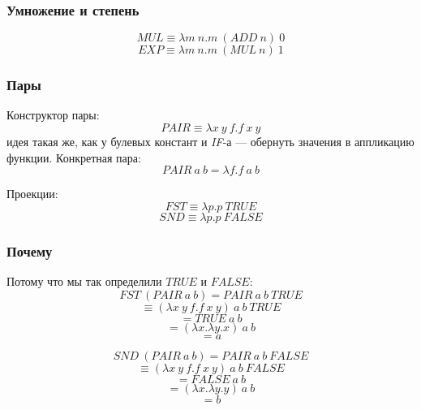 \documentclass[xetex,mathserif,serif]{beamer}
\begin{document}
	\begin{frame}
		\frametitle{Умножение и степень}
		$$MUL \equiv \lambda m\ n.m\ (ADD\ n)\ 0$$
		$$EXP \equiv \lambda m\ n.m\ (MUL\ n)\ 1$$
	\end{frame}

	\begin{frame}
		\frametitle{Пары}
		Конструктор пары:
		$$PAIR \equiv \lambda x\ y\ f.f\ x\ y$$
		идея такая же, как у булевых констант и \textit{IF}-а --- обернуть значения в аппликацию функции. Конкретная пара:
		$$PAIR\ a\ b = \lambda f.f\ a\ b$$
		
		Проекции:
		$$FST \equiv \lambda p.p\ TRUE$$
		$$SND \equiv \lambda p.p\ FALSE$$
	\end{frame}

	\begin{frame}
		\frametitle{Почему}
		Потому что мы так определили $TRUE$ и $FALSE$:
		$$FST\ (PAIR\ a\ b) = PAIR\ a\ b\ TRUE$$
		$$\equiv (\lambda x\ y\ f.f\ x\ y)\ a\ b\ TRUE$$
		$$= TRUE\ a\ b$$
		$$= (\lambda x.\lambda y.x)\ a\ b$$
		$$= a$$

		$$SND\ (PAIR\ a\ b) = PAIR\ a\ b\ FALSE$$
		$$\equiv (\lambda x\ y\ f.f\ x\ y)\ a\ b\ FALSE$$
		$$= FALSE\ a\ b$$
		$$= (\lambda x.\lambda y.y)\ a\ b$$
		$$= b$$
	\end{frame}
\end{document}
